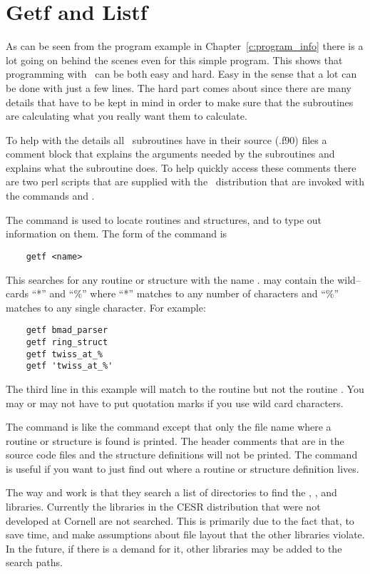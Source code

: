 \section{Getf and Listf}
\label{s:getf}

As can be seen from the program example in Chapter~\ref{c:program_info}
there is a lot going on behind the scenes even for this
simple program. This shows that programming with \bmad\ can be both easy
and hard. Easy in the sense that a lot can be done with just a few
lines. The hard part comes about since there are many details that
have to be kept in mind in order to make sure that the subroutines
are calculating what you really want them to calculate.

To help with the details all \bmad\ subroutines have in their source (.f90)
files a comment block that explains the arguments needed by the
subroutines and explains what the subroutine does. To help quickly
access these comments there are two perl scripts that are supplied
with the \bmad\ distribution that are invoked with the commands
 and .

The  command is used to locate routines and structures, and
to type out information on them.  The form of the command is
\begin{verbatim}
    getf <name>
\end{verbatim}
This searches for any routine or structure with the name
.  may contain the wild--cards ``*'' and ``\%'' where
``*'' matches to any number of characters and ``\%'' matches to any
single character. For example:
\begin{verbatim}
    getf bmad_parser
    getf ring_struct
    getf twiss_at_%
    getf 'twiss_at_%'
\end{verbatim}
The third line in this example will match to the routine
 but not the routine . You may or may not
have to put quotation marks if you use wild card characters.

The  command is like the  command except that only
the file name where a routine or structure is found is printed. The
header comments that are in the source code files and the structure
definitions will not be printed. The  command is useful if you
want to just find out where a routine or structure definition lives.

The way  and  work is that they search a list of
directories to find the \bmad, , and 
libraries. Currently the libraries in the CESR distribution that were
not developed at Cornell are not searched. This is primarily due to
the fact that, to save time,  and  make assumptions
about file layout that the other libraries violate. In the future, if
there is a demand for it, other libraries may be added to the search
paths.

